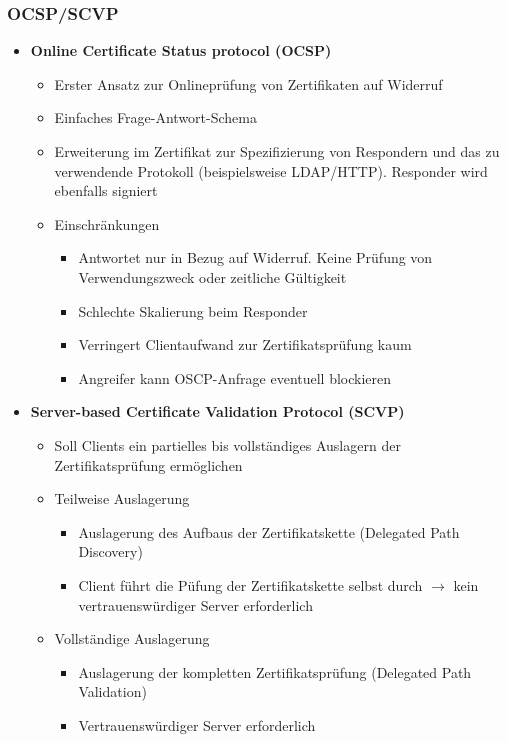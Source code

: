 \subsubsection{OCSP/SCVP}
\begin{itemize}
	\item \textbf{Online Certificate Status protocol (OCSP)}
	\begin{itemize}
		\item Erster Ansatz zur Onlineprüfung von Zertifikaten auf Widerruf
		\item Einfaches Frage-Antwort-Schema
		\item Erweiterung im Zertifikat zur Spezifizierung von Respondern und das zu verwendende Protokoll (beispielsweise LDAP/HTTP). Responder wird ebenfalls signiert
		\item Einschränkungen
		\begin{itemize}
			\item Antwortet nur in Bezug auf Widerruf. Keine Prüfung von Verwendungszweck oder zeitliche Gültigkeit
			\item Schlechte Skalierung beim Responder
			\item Verringert Clientaufwand zur Zertifikatsprüfung kaum
			\item Angreifer kann OSCP-Anfrage eventuell blockieren
		\end{itemize}
	\end{itemize}
	\item \textbf{Server-based Certificate Validation Protocol (SCVP)}
	\begin{itemize}
		\item Soll Clients ein partielles bis vollständiges Auslagern der Zertifikatsprüfung ermöglichen
		\item Teilweise Auslagerung
		\begin{itemize}
			\item Auslagerung des Aufbaus der Zertifikatskette (Delegated Path Discovery)
			\item Client führt die Püfung der Zertifikatskette selbst durch \(\rightarrow\) kein vertrauenswürdiger Server erforderlich
		\end{itemize}
		\item Vollständige Auslagerung
		\begin{itemize}
			\item Auslagerung der kompletten Zertifikatsprüfung (Delegated Path Validation)
			\item Vertrauenswürdiger Server erforderlich
		\end{itemize}
	\end{itemize}
\end{itemize}



